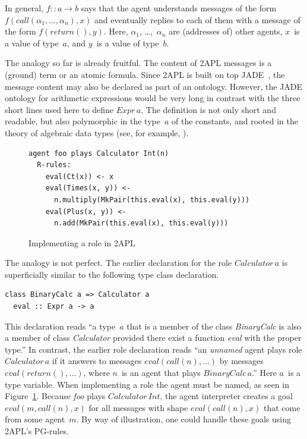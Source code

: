\documentclass[a4paper,12pt,oneside,fleqn]{book} %
\begin{document}
{In general, $f::a\to b$ says that the agent understands messages of the
form $f(\mathit{call}(\alpha_1,\ldots,\alpha_n),x)$ and eventually replies
to each of them with a message of the form $f(\mathit{return}(),y)$. Here,
$\alpha_1$, \dots,~$\alpha_n$ are (addresses of) other agents, $x$~is a
value of type~$a$, and $y$~is a value of type~$b$.

The analogy so far is already fruitful. The content of 2APL messages is a
(ground) term or an atomic formula. Since 2APL is built on top
JADE~\cite{DBLP:books/sp/map2005/BellifemineBCP05}, the message content may
also be declared as part of an ontology. However, the JADE ontology for
arithmetic expressions would be very long in contrast with the three short
lines used here to define $\mathit{Expr}\,a$. The definition is not only
short and readable, but also polymorphic in the type~$a$ of the constants,
and rooted in the theory of algebraic data types (see, for example,
\cite{DBLP:conf/ctcs/Hagino87}).

\begin{figure}\footnotesize %
\begin{verbatim}
agent foo plays Calculator Int(n)
  R-rules:
    eval(Ct(x)) <- x
    eval(Times(x, y)) <-
      n.multiply(MkPair(this.eval(x), this.eval(y)))
    eval(Plus(x, y)) <-
      n.add(MkPair(this.eval(x), this.eval(y)))
\end{verbatim}
\caption{Implementing a role in 2APL}\label{fig:roleimpl2APL}
\end{figure} %

The analogy is not perfect. The earlier declaration for the role
$\mathit{Calculator}\,a$ is superficially similar to the following type
class declaration.
\begin{verbatim}
class BinaryCalc a => Calculator a
  eval :: Expr a -> a
\end{verbatim}

This declaration reads ``a type~$a$ that is a member of the class
\textit{BinaryCalc} is also a member of class \textit{Calculator} provided
there exist a function \textit{eval} with the proper type.'' In contrast,
the earlier role declaration reads ``an \emph{unnamed} agent plays role
$\mathit{Calculator}\,a$ if it answers to messages
$\mathit{eval}(\mathit{call}(n),\ldots)$ by messages
$\mathit{eval}(\mathit{return}(),\ldots)$, where $n$~is an agent that plays
$\mathit{BinaryCalc}\,a$.'' Here $a$~is a type variable.  When implementing
a role the agent must be named, as seen in Figure~\ref{fig:roleimpl2APL}.
Because \textit{foo} plays $\mathit{Calculator}\,\mathit{Int}$, the agent
interpreter creates a goal $\mathit{eval}(m,\mathit{call}(n),x)$ for all
messages with shape $\mathit{eval}(\mathit{call}(n),x)$ that come from some
agent~$m$. By way of illustration, one could handle these goals using 2APL's PG-rules.

}
\end{document}
